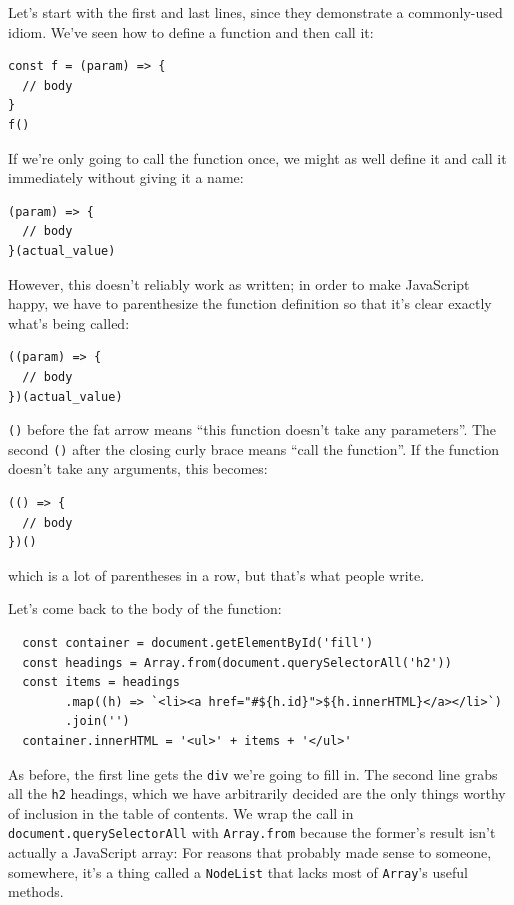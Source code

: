 Let's start with the first and last lines, since they demonstrate a
commonly-used idiom. We've seen how to define a function and then call
it:

\begin{verbatim}
const f = (param) => {
  // body
}
f()
\end{verbatim}

If we're only going to call the function once, we might as well define
it and call it immediately without giving it a name:

\begin{verbatim}
(param) => {
  // body
}(actual_value)
\end{verbatim}

However, this doesn't reliably work as written; in order to make
JavaScript happy, we have to parenthesize the function definition so
that it's clear exactly what's being called:

\begin{verbatim}
((param) => {
  // body
})(actual_value)
\end{verbatim}

\texttt{()} before the fat arrow means ``this function doesn't take any
parameters''. The second \texttt{()} after the closing curly brace means
``call the function''. If the function doesn't take any arguments, this
becomes:

\begin{verbatim}
(() => {
  // body
})()
\end{verbatim}

which is a lot of parentheses in a row, but that's what people write.

Let's come back to the body of the function:

\begin{verbatim}
  const container = document.getElementById('fill')
  const headings = Array.from(document.querySelectorAll('h2'))
  const items = headings
        .map((h) => `<li><a href="#${h.id}">${h.innerHTML}</a></li>`)
        .join('')
  container.innerHTML = '<ul>' + items + '</ul>'
\end{verbatim}

As before, the first line gets the \texttt{div} we're going to fill in.
The second line grabs all the \texttt{h2} headings, which we have
arbitrarily decided are the only things worthy of inclusion in the table
of contents. We wrap the call in \texttt{document.querySelectorAll} with
\texttt{Array.from} because the former's result isn't actually a
JavaScript array: For reasons that probably made sense to someone,
somewhere, it's a thing called a \texttt{NodeList} that lacks most of
\texttt{Array}'s useful methods.

